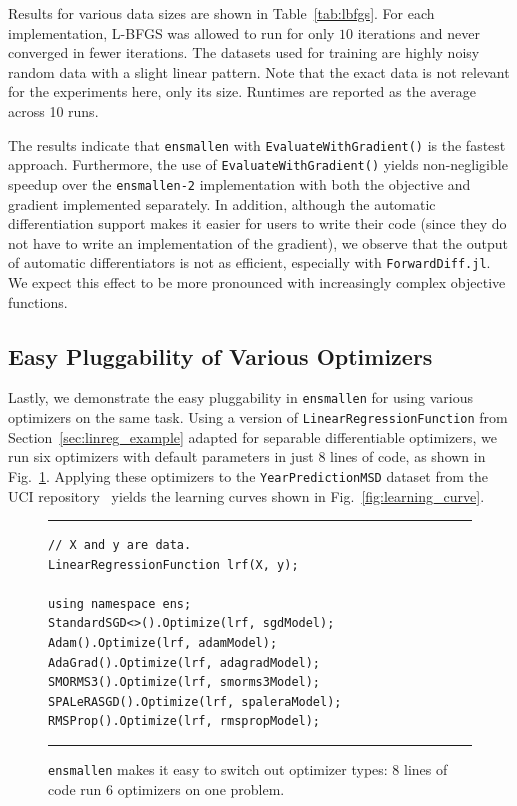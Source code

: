 Results for various data sizes are shown in Table~\ref{tab:lbfgs}.  For each
implementation, L-BFGS was allowed to run for only $10$ iterations and never
converged in fewer iterations.  The datasets used for training are highly noisy random
data with a slight linear pattern. Note that the exact data is not relevant
for the experiments here, only its size.  Runtimes are reported as the
average across 10 runs.

The results indicate that \texttt{ensmallen} with
\texttt{EvaluateWithGradient()} is the fastest approach.
Furthermore, the use of \texttt{EvaluateWithGradient()} yields
non-negligible speedup over the \texttt{ensmallen-2} implementation with
both the objective and gradient implemented separately.  In addition, although
the automatic differentiation support makes it easier for users to write their
code (since they do not have to write an implementation of the gradient), we
observe that the output of automatic differentiators is not as efficient,
especially with \texttt{ForwardDiff.jl}.  We expect this effect to be
more pronounced with increasingly complex objective functions.

\subsection{Easy Pluggability of Various Optimizers}

Lastly, we demonstrate the easy pluggability in \texttt{ensmallen}
for using various optimizers on the same task.
Using a version of {\tt LinearRegressionFunction} from
Section~\ref{sec:linreg_example} adapted for separable differentiable
optimizers, we run six optimizers with default parameters in just 8 lines of
code, as shown in Fig.~\ref{fig:learning_curve_code}.
Applying these optimizers to the \texttt{YearPredictionMSD}
dataset from the UCI repository~\cite{ucimlrepository}
yields the learning curves shown in Fig.~\ref{fig:learning_curve}.

\begin{figure}[b!]
\hrule
\vspace{1ex}
\begin{verbatim}
// X and y are data.
LinearRegressionFunction lrf(X, y);

using namespace ens;
StandardSGD<>().Optimize(lrf, sgdModel);
Adam().Optimize(lrf, adamModel);
AdaGrad().Optimize(lrf, adagradModel);
SMORMS3().Optimize(lrf, smorms3Model);
SPALeRASGD().Optimize(lrf, spaleraModel);
RMSProp().Optimize(lrf, rmspropModel);
\end{verbatim}
\hrule
\vspace*{-0.5em}
\caption{{\tt ensmallen} makes it easy to switch out optimizer types:
8 lines of code run 6 optimizers on one problem.}
\label{fig:learning_curve_code}
\end{figure}

